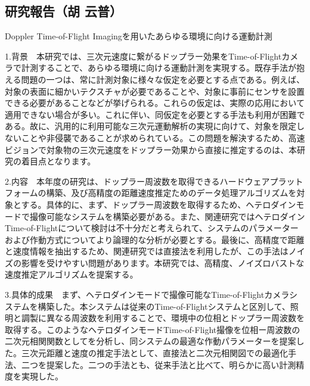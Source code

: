 \subsection{研究報告（胡 云普）}

Doppler Time-of-Flight Imagingを用いたあらゆる環境に向ける運動計測

1.背景　本研究では、三次元速度に繋がるドップラー効果をTime-of-Flightカメラで計測することで、あらゆる環境に向ける運動計測を実現する。既存手法が抱える問題の一つは、常に計測対象に様々な仮定を必要とする点である。例えば、対象の表面に細かいテクスチャが必要であることや、対象に事前にセンサを設置できる必要があることなどが挙げられる。これらの仮定は、実際の応用において適用できない場合が多い。これに伴い、同仮定を必要とする手法も利用が困難である。故に、汎用的に利用可能な三次元運動解析の実現に向けて、対象を限定しないことや非侵襲であることが求められている。この問題を解決するため、高速ビジョンで対象物の三次元速度をドップラー効果から直接に推定するのは、本研究の着目点となります。

2.内容　本年度の研究は、ドップラー周波数を取得できるハードウェアプラットフォームの構築、及び高精度の距離速度推定ためのデータ処理アルゴリズムを対象とする。具体的に、まず、ドップラー周波数を取得するため、ヘテロダインモードで撮像可能なシステムを構築必要がある。また、関連研究ではヘテロダインTime-of-Flightについて検討は不十分だと考えられて、システムのパラメーターおよび作動方式についてより論理的な分析が必要とする。最後に、高精度で距離と速度情報を抽出するため、関連研究では直接法を利用したが、この手法はノイズの影響を受けやすい問題があります。本研究では、高精度、ノイズロバストな速度推定アルゴリズムを提案する。

3.具体的成果　まず、ヘテロダインモードで撮像可能なTime-of-Flightカメラシステムを構築した。本システムは従来のTime-of-Flightシステムと区別して、照明と調製に異なる周波数を利用することで、環境中の位相とドップラー周波数を取得する。このようなヘテロダインモードTime-of-Flight撮像を位相ー周波数の二次元相関関数としてを分析し、同システムの最適な作動パラメーターを提案した。三次元距離と速度の推定手法として、直接法と二次元相関図での最適化手法、二つを提案した。二つの手法とも、従来手法と比べて、明らかに高い計測精度を実現した。

